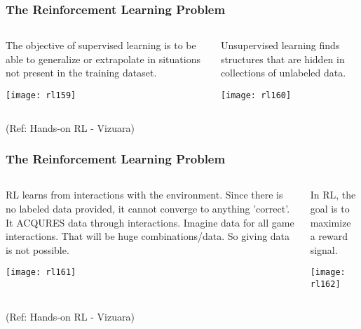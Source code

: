 \begin{frame}[fragile]\frametitle{The Reinforcement Learning Problem}

\begin{columns}
    \begin{column}[T]{0.5\linewidth}
		The objective of supervised learning is to be able to generalize or extrapolate in situations not present in the training dataset.

		\begin{center}
		\texttt{[image: rl159]}

		\end{center}

    \end{column}
    \begin{column}[T]{0.5\linewidth}
		Unsupervised learning finds structures that are hidden in collections of unlabeled data.

		\begin{center}
		\texttt{[image: rl160]}

		\end{center}
    \end{column}
  \end{columns}

{\tiny (Ref: Hands-on RL - Vizuara)}

\end{frame}

\begin{frame}[fragile]\frametitle{The Reinforcement Learning Problem}

\begin{columns}
    \begin{column}[T]{0.5\linewidth}
		RL learns from interactions with the environment. Since there is no labeled data provided, it cannot converge to anything 'correct'.
		It ACQURES data through interactions. Imagine data for all game interactions. That will be huge combinations/data. So giving data is not possible.
		
		\begin{center}
		\texttt{[image: rl161]}

		\end{center}

    \end{column}
    \begin{column}[T]{0.5\linewidth}
		In RL, the goal is to maximize a reward signal. 

		\begin{center}
		\texttt{[image: rl162]}

		\end{center}
    \end{column}
  \end{columns}

{\tiny (Ref: Hands-on RL - Vizuara)}

\end{frame}


